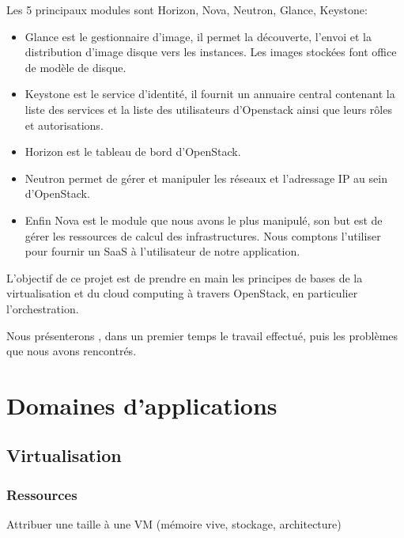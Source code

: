 \documentclass{report}
\begin{document}
    Les 5 principaux modules sont Horizon, Nova, Neutron, Glance, Keystone:
    \begin{itemize}
        \item Glance est le gestionnaire d'image, il permet la découverte, l'envoi et la distribution d'image disque vers les instances. Les images stockées font office de modèle de disque.
        \item  Keystone est le service d'identité, il fournit un annuaire central contenant la liste des services et la liste des utilisateurs d'Openstack ainsi que leurs rôles et autorisations.
        \item  Horizon est le tableau de bord d'OpenStack.
        \item  Neutron permet de gérer et manipuler les réseaux et l'adressage IP au sein d'OpenStack.
        \item  Enfin Nova est le module que nous avons le plus manipulé, son but est de gérer les ressources de calcul des infrastructures. Nous comptons l'utiliser pour fournir un SaaS à l'utilisateur de notre application. 
    \end{itemize}
    \bigbreak
    
    L'objectif de ce projet est de prendre en main les principes de bases de la virtualisation et du cloud computing à travers OpenStack, en particulier l'orchestration.\bigbreak
    
    Nous présenterons , dans un premier temps le travail effectué, puis les problèmes que nous avons rencontrés.\bigbreak
    
    
\newpage
\chapter{Domaines d'applications}

    \section{Virtualisation}
        \subsection{Ressources}
            Attribuer une taille à une VM (mémoire vive, stockage, architecture)
\end{document}
